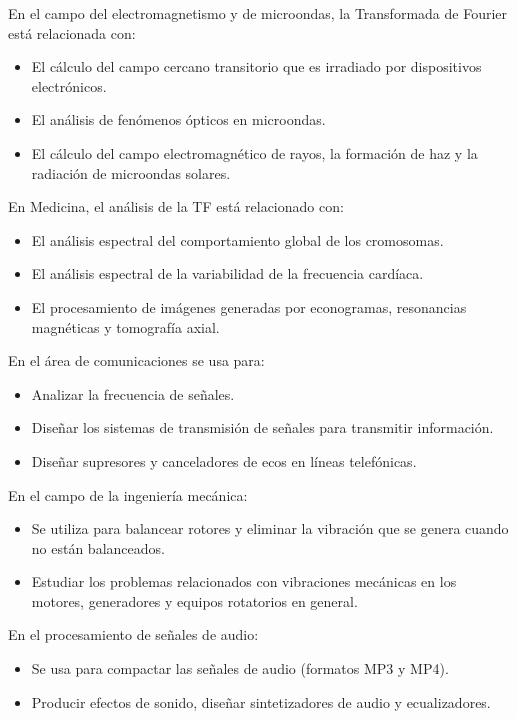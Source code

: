 En el campo del electromagnetismo y de microondas, la Transformada de Fourier está relacionada con:
\begin{itemize}
\item El cálculo del campo cercano transitorio que es irradiado por dispositivos electrónicos.
\item El análisis de fenómenos ópticos en microondas.
\item El cálculo del campo electromagnético de rayos, la formación de haz y la radiación de microondas solares.
\end{itemize}

En Medicina, el análisis de la TF está relacionado con:
\begin{itemize}
\item El análisis espectral del comportamiento global de los cromosomas.
\item El análisis espectral de la variabilidad de la frecuencia cardíaca.
\item El procesamiento de imágenes generadas por econogramas, resonancias magnéticas y tomografía axial.
\end{itemize}

En el área de comunicaciones se usa para:
\begin{itemize}
\item Analizar la frecuencia de señales.
\item Diseñar los sistemas de transmisión de señales para transmitir información.
\item Diseñar supresores y canceladores de ecos en líneas telefónicas.
\end{itemize}

En el campo de la ingeniería mecánica:
\begin{itemize}
\item  Se utiliza para balancear rotores y eliminar la vibración que se genera cuando no están balanceados.
\item Estudiar los problemas relacionados con vibraciones mecánicas en los motores, generadores y equipos rotatorios en general.
\end{itemize}

En el procesamiento de señales de audio:
\begin{itemize}
\item Se usa para compactar las señales de audio (formatos MP3 y MP4).
\item Producir efectos de sonido, diseñar sintetizadores de audio y ecualizadores.
\end{itemize}

